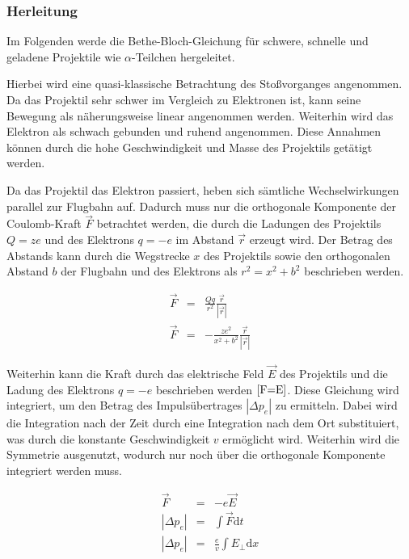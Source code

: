 \documentclass[12pt,a4paper]{scrartcl}
\numberwithin{equation}{section} %
\renewcommand{\[}{} %
\renewcommand{\]}{\noindent} %
\begin{document}
\hypertarget{herleitung}{%
\subsubsection{Herleitung}\label{herleitung}}

Im Folgenden werde die Bethe-Bloch-Gleichung für schwere, schnelle und
geladene Projektile wie \(\alpha\)-Teilchen hergeleitet.

Hierbei wird eine quasi-klassische Betrachtung des Stoßvorganges
angenommen. Da das Projektil sehr schwer im Vergleich zu Elektronen ist,
kann seine Bewegung als näherungsweise linear angenommen werden.
Weiterhin wird das Elektron als schwach gebunden und ruhend angenommen.
Diese Annahmen können durch die hohe Geschwindigkeit und Masse des
Projektils getätigt werden.

Da das Projektil das Elektron passiert, heben sich sämtliche
Wechselwirkungen parallel zur Flugbahn auf. Dadurch muss nur die
orthogonale Komponente der Coulomb-Kraft \(\vec F\) betrachtet werden,
die durch die Ladungen des Projektils \(Q=ze\) und des Elektrons
\(q=-e\) im Abstand \(\vec r\) erzeugt wird. Der Betrag des Abstands
kann durch die Wegstrecke \(x\) des Projektils sowie den orthogonalen
Abstand \(b\) der Flugbahn und des Elektrons als \(r^2=x^2+b^2\)
beschrieben werden.

\[
\begin{eqnarray}
    \vec F &=& \frac{Qq}{r^2} \frac{\vec{r}}{\left|\vec r\right|} \\
    \vec F &=& -\frac{ze^2}{x^2+b^2} \frac{\vec{r}}{\left|\vec r\right|}
\end{eqnarray}
\]

Weiterhin kann die Kraft durch das elektrische Feld \(\vec E\) des
Projektils und die Ladung des Elektrons \(q=-e\) beschrieben werden
\(\eqref{F=E}\). Diese Gleichung wird integriert, um den Betrag des
Impulsübertrages \(\left|\Delta p_e\right|\) zu ermitteln. Dabei wird
die Integration nach der Zeit durch eine Integration nach dem Ort
substituiert, was durch die konstante Geschwindigkeit \(v\) ermöglicht
wird. Weiterhin wird die Symmetrie ausgenutzt, wodurch nur noch über die
orthogonale Komponente integriert werden muss.

\[
\begin{eqnarray}
    \vec F &=& -e \vec E \label{F=E} \\
    \left|\Delta p_e\right| &=& \int \vec F \mathrm dt \\
    \left|\Delta p_e\right| &=& \frac{e}{v} \int E_\perp \mathrm dx
\end{eqnarray}
\]
\end{document}
